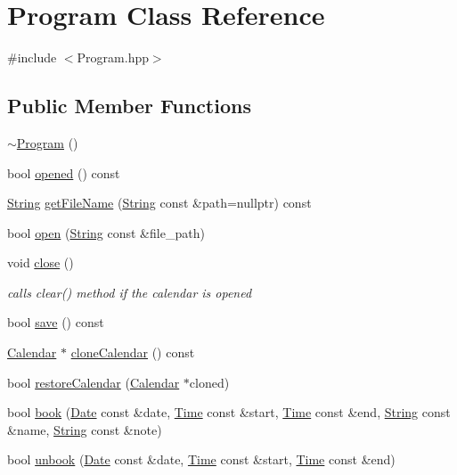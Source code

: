 \hypertarget{classProgram}{}\section{Program Class Reference}
\label{classProgram}


{\ttfamily \#include $<$Program.\+hpp$>$}

\subsection*{Public Member Functions}
\begin{DoxyCompactItemize}
\item 
\hyperlink{classProgram_a986aef1c50e1d338a3315a47ba6df549}{$\sim$\+Program} ()
\item 
bool \hyperlink{classProgram_a2f494b9e0a50657ac89a61a96e92face}{opened} () const
\item 
\hyperlink{classString}{String} \hyperlink{classProgram_a78c686e8f768666e0377b23317134b4a}{get\+File\+Name} (\hyperlink{classString}{String} const \&path=nullptr) const
\item 
bool \hyperlink{classProgram_a4658796d44178138e3c50df2346f20c9}{open} (\hyperlink{classString}{String} const \&file\+\_\+path)
\item 
void \hyperlink{classProgram_ab8b7a28d1be3f1b8c5136e936c75ca63}{close} ()
\begin{DoxyCompactList}\small\item\em calls clear() method if the calendar is opened \end{DoxyCompactList}\item 
bool \hyperlink{classProgram_a9ab390cc3caa8cc7dee9704a273a6979}{save} () const
\item 
\hyperlink{classCalendar}{Calendar} $\ast$ \hyperlink{classProgram_ae2bc41544b2cedf95611867ead89d6c9}{clone\+Calendar} () const
\item 
bool \hyperlink{classProgram_a0c4c553237a075bc9ab5d4c6b80b4471}{restore\+Calendar} (\hyperlink{classCalendar}{Calendar} $\ast$cloned)
\item 
bool \hyperlink{classProgram_a3fd5b4cf3d1eaa58809f593ccdc7a2d3}{book} (\hyperlink{classDate}{Date} const \&date, \hyperlink{classTime}{Time} const \&start, \hyperlink{classTime}{Time} const \&end, \hyperlink{classString}{String} const \&name, \hyperlink{classString}{String} const \&note)
\item 
bool \hyperlink{classProgram_a86a0e7e6c345dd50643cc6f466fb965a}{unbook} (\hyperlink{classDate}{Date} const \&date, \hyperlink{classTime}{Time} const \&start, \hyperlink{classTime}{Time} const \&end)

\end{DoxyCompactItemize}

